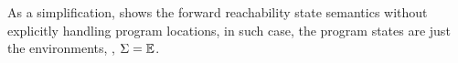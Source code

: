 
As a simplification,  shows the forward reachability state semantics without explicitly handling program locations, in such case, the program states are just the environments, \ie, $\Sigma = \mathbb{E}$.



